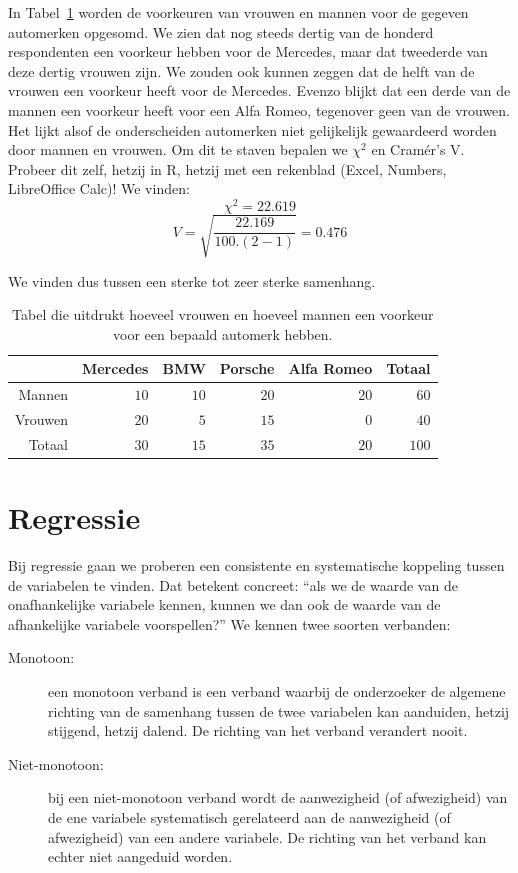 

\begin{example}
  In Tabel~\ref{tab:autovoorkeur} worden de voorkeuren van vrouwen en mannen voor de gegeven automerken opgesomd. We zien dat nog steeds dertig van de honderd respondenten een voorkeur hebben voor de Mercedes, maar dat tweederde van deze dertig vrouwen zijn. We zouden  ook kunnen zeggen dat de helft van de vrouwen een voorkeur heeft voor de Mercedes. Evenzo blijkt dat een derde van de mannen een voorkeur heeft voor een Alfa Romeo, tegenover geen van de vrouwen. Het lijkt alsof de onderscheiden automerken niet gelijkelijk gewaardeerd worden door mannen en vrouwen. Om dit te staven bepalen we $\chi^{2}$ en Cramér's V. Probeer dit zelf, hetzij in R, hetzij met een rekenblad (Excel, Numbers, LibreOffice Calc)! We vinden:
  \[ \chi^{2} = 22.619 \]
  \[ V = \sqrt{\frac{22.169}{100 . (2-1)}}  = 0.476\]

  We vinden dus tussen een sterke tot zeer sterke samenhang.
\end{example}

\begin{table} \centering
  \begin{tabular}{@{}rrrrrr@{}}
  	\toprule
  	        & Mercedes &  BMW & Porsche & Alfa Romeo & Totaal \\ \midrule
  	 Mannen &     $10$ & $10$ &    $20$ &       $20$ &   $60$ \\
  	Vrouwen &     $20$ &  $5$ &    $15$ &        $0$ &   $40$ \\
  	 Totaal &     $30$ & $15$ &    $35$ &       $20$ &  $100$ \\ \bottomrule
  \end{tabular}
  \caption{Tabel die uitdrukt hoeveel vrouwen en hoeveel mannen een voorkeur voor een bepaald automerk hebben.}
  \label{tab:autovoorkeur}
\end{table}

\section{Regressie}
\label{sec:regressie}

Bij  regressie gaan we proberen een consistente en systematische koppeling tussen de variabelen te vinden. Dat betekent concreet: ``als we de waarde van de onafhankelijke variabele kennen, kunnen we dan ook de waarde van de afhankelijke variabele voorspellen?'' We kennen twee soorten verbanden:
\begin{description}
  \item [Monotoon:] een monotoon verband is een verband waarbij de onderzoeker de algemene richting van de samenhang tussen de twee variabelen kan aanduiden, hetzij stijgend, hetzij dalend. De richting van het verband verandert nooit.
  \item [Niet-monotoon:] bij een niet-monotoon verband wordt de aanwezigheid (of afwezigheid) van de ene variabele systematisch gerelateerd aan de aanwezigheid (of afwezigheid) van een andere variabele. De richting van het verband kan echter niet aangeduid worden.
\end{description}

